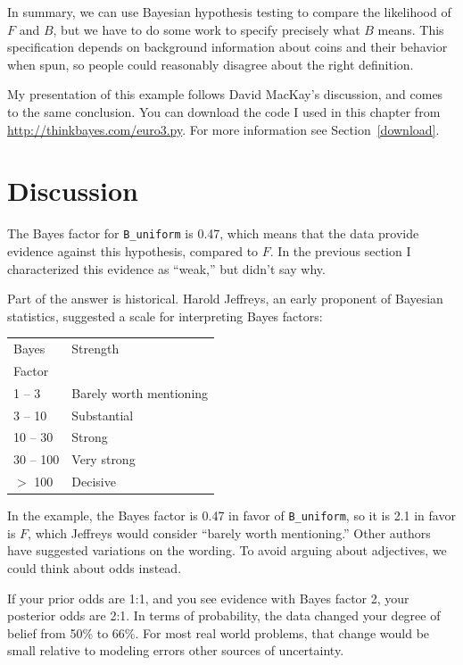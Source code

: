 \documentclass[12pt]{book}
\begin{document}
In summary, we can use Bayesian hypothesis testing to compare the
likelihood of $F$ and $B$, but we have to do some work to specify
precisely what $B$ means.  This specification depends on background
information about coins and their behavior when spun, so people
could reasonably disagree about the right definition.

My presentation of this example follows
David MacKay's discussion, and comes to the same conclusion.
You can download the code I used in this chapter from
\url{http://thinkbayes.com/euro3.py}.
  For more information
see Section~\ref{download}.

\section{Discussion}

The Bayes factor for \verb"B_uniform" is 0.47, which means
that the data provide evidence against this hypothesis, compared
to $F$.  In the previous section I characterized this evidence
as ``weak,'' but didn't say why.

Part of the answer is historical.  Harold Jeffreys, an early
proponent of Bayesian statistics, suggested a scale for
interpreting Bayes factors:

\begin{tabular}{|l|l|}
\hline
Bayes & Strength \\
Factor & \\
\hline
1 -- 3 & Barely worth mentioning \\
3 -- 10 & Substantial \\
10 -- 30 & Strong \\
30 -- 100 & Very strong \\
$>$ 100 & Decisive \\
\hline
\end{tabular}

In the example, the Bayes factor is 0.47 in favor of \verb"B_uniform",
so it is 2.1 in favor is $F$, which Jeffreys would consider ``barely
worth mentioning.''  Other authors have suggested variations on the
wording.  To avoid arguing about adjectives, we could think about odds
instead.

If your prior odds are 1:1, and you see evidence with Bayes
factor 2, your posterior odds are 2:1.  In terms of probability,
the data changed your degree of belief from 50\% to 66\%.  For
most real world problems, that change would be small relative
to modeling errors other sources of uncertainty.
\end{document}
